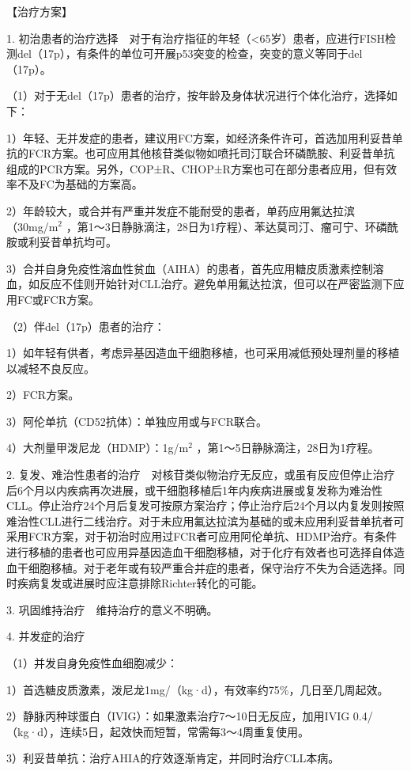 【治疗方案】

1.
初治患者的治疗选择　对于有治疗指征的年轻（<65岁）患者，应进行FISH检测del（17p），有条件的单位可开展p53突变的检查，突变的意义等同于del（17p）。

（1）对于无del（17p）患者的治疗，按年龄及身体状况进行个体化治疗，选择如下：

1）年轻、无并发症的患者，建议用FC方案，如经济条件许可，首选加用利妥昔单抗的FCR方案。也可应用其他核苷类似物如喷托司汀联合环磷酰胺、利妥昔单抗组成的PCR方案。另外，COP±R、CHOP±R方案也可在部分患者应用，但有效率不及FC为基础的方案高。

2）年龄较大，或合并有严重并发症不能耐受的患者，单药应用氟达拉滨（30mg/m$^2$
，第1～3日静脉滴注，28日为1疗程）、苯达莫司汀、瘤可宁、环磷酰胺或利妥昔单抗均可。

3）合并自身免疫性溶血性贫血（AIHA）的患者，首先应用糖皮质激素控制溶血，如反应不佳则开始针对CLL治疗。避免单用氟达拉滨，但可以在严密监测下应用FC或FCR方案。

（2）伴del（17p）患者的治疗：

1）如年轻有供者，考虑异基因造血干细胞移植，也可采用减低预处理剂量的移植以减轻不良反应。

2）FCR方案。

3）阿伦单抗（CD52抗体）：单独应用或与FCR联合。

4）大剂量甲泼尼龙（HDMP）：1g/m$^2$
，第1～5日静脉滴注，28日为1疗程。

2.
复发、难治性患者的治疗　对核苷类似物治疗无反应，或虽有反应但停止治疗后6个月以内疾病再次进展，或干细胞移植后1年内疾病进展或复发称为难治性CLL。停止治疗24个月后复发可按原方案治疗；停止治疗后24个月以内复发则按照难治性CLL进行二线治疗。对于未应用氟达拉滨为基础的或未应用利妥昔单抗者可采用FCR方案，对于初治时应用过FCR者可应用阿伦单抗、HDMP治疗。有条件进行移植的患者也可应用异基因造血干细胞移植，对于化疗有效者也可选择自体造血干细胞移植。对于老年或有较严重合并症的患者，保守治疗不失为合适选择。同时疾病复发或进展时应注意排除Richter转化的可能。

3. 巩固维持治疗　维持治疗的意义不明确。

4. 并发症的治疗

（1）并发自身免疫性血细胞减少：

1）首选糖皮质激素，泼尼龙1mg/（kg·d），有效率约75\%，几日至几周起效。

2）静脉丙种球蛋白（IVIG）：如果激素治疗7～10日无反应，加用IVIG
0.4/（kg·d），连续5日，起效快而短暂，常需每3～4周重复使用。

3）利妥昔单抗：治疗AHIA的疗效逐渐肯定，并同时治疗CLL本病。

